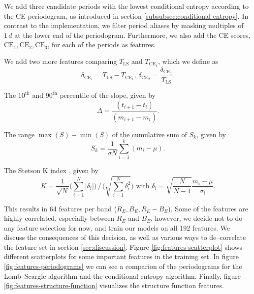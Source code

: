 \begin{enumerate}
 We add three candidate periods with the lowest conditional entropy according to the CE periodogram, as introduced in section \ref{subsubsec:conditional-entropy}. In contrast to the \citeauthor{graham2013} implementation, we filter period aliases by masking multiples of $1 \, \unit{d}$ at the lower end of the periodogram. Furthermore, we also add the CE scores, $\text{CE}_1, \text{CE}_2, \text{CE}_3$, for each of the periods as features.

 We add two more features comparing $T_{\text{LS}}$ and $T_{\text{CE}_1}$, which we define as
\begin{equation}\delta_{\text{CE}_1} = T_{\text{LS}} - T_{\text{CE}_1}, \, \delta_{\text{CE}_2} = \frac{\delta_{\text{CE}_1}}{T_{\text{LS}}}.\end{equation}

 The $10^\text{th}$ and $90^\text{th}$ percentile of the slope, given by
\begin{equation}\Delta = \frac{(t_{i+1} - t_i)}{(m_{i+1} - m_i)}.\end{equation}

 The range $\max(S) - \min(S)$ of the cumulative sum \citep{ellaway1978} of $S_k$, given by
\begin{equation}S_k = \frac{1}{\sigma N} \sum\limits_{i=1}^k (m_i - \mu) .\end{equation}

 The Stetson K index \citep{stetson1996}, given by
\begin{equation}K = \frac{1}{\sqrt{N}} \big( \sum\limits_{i=1}^N |\delta_i| \big) \, / \, \big( \sqrt{\sum\limits_{i=1}^N \delta_i^2} \big) \text{ with } \delta_i = \sqrt{\frac{N}{N-1}} \frac{m_i - \mu}{\sigma_i}.\end{equation}

\end{enumerate}

This results in 64 features per band ($R_E, B_E, R_E - B_E$). Some of the features are highly correlated, especially between $R_E$ and $B_E$, however, we decide not to do any feature selection for now, and train our models on all 192 features. We discuss the consequences of this decision, as well as various ways to de--correlate the feature set in section \ref{sec:discussion}. Figure \ref{fig:features-scatterplot} shows different scatterplots for some important features in the training set. In figure \ref{fig:features-periodograms} we can see a comparion of the periodograms for the Lomb--Scargle algorithm and the conditional entropy algorithm. Finally, figure \ref{fig:features-structure-function} visualizes the structure function features.

